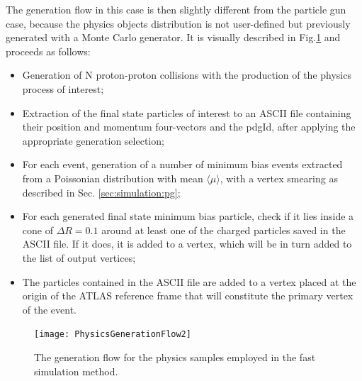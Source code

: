 \documentclass[a4paper,twoside,12pt]{book}
\begin{document}

The generation flow in this case is then slightly different from the particle gun case, because 
the physics objects distribution is not user-defined but previously generated with a Monte
Carlo generator. It is visually described in Fig.\ref{fig:PhysicsGenerationFlow} and proceeds as follows:\\

\begin{itemize}
\item Generation of N proton-proton collisions with the production of the physics process of
interest;
\item Extraction of the final state particles of interest to an ASCII file containing their
position and momentum four-vectors and the pdgId, after applying the appropriate generation selection;
\item For each event, generation of a number of minimum bias events extracted from a Poissonian distribution with mean $\langle\mu\rangle$, 
	with a vertex smearing as described in Sec. \ref{sec:simulation:pg};
\item For each generated final state minimum bias particle, check if it lies inside a cone of 
$\Delta R = 0.1$ around at least one of the charged particles saved in the ASCII file. If it does,
it is added to a vertex, which will be in turn added to the list of output vertices;
\item The particles contained in the ASCII file are added to a vertex placed at the origin
of the ATLAS reference frame that will constitute the primary vertex of the event.

\end{itemize}

\begin{figure} [h]
	\texttt{[image: PhysicsGenerationFlow2]}
	\caption{The generation flow for the physics samples employed in the fast 
	simulation method. }
	\label{fig:PhysicsGenerationFlow}
\end{figure}
\end{document}
